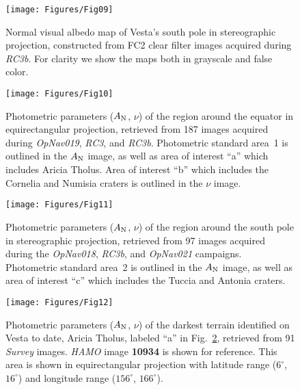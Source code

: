 \documentclass[3p,authoryear]{elsarticle}
\begin{document}

\begin{figure}
\centering
\texttt{[image: Figures/Fig09]}
\caption{Normal visual albedo map of Vesta's south pole in stereographic projection, constructed from FC2 clear filter images acquired during {\it RC3b}. For clarity we show the maps both in grayscale and false color.}
\label{fig:albedo_map_polar}
\end{figure}


\begin{figure}
\centering
\texttt{[image: Figures/Fig10]}
\caption{Photometric parameters ($A_{\rm N}$, $\nu$) of the region around the equator in equirectangular projection, retrieved from 187 images acquired during {\it OpNav019}, {\it RC3}, and {\it RC3b}. Photometric standard area~1 is outlined in the $A_{\rm N}$ image, as well as area of interest ``a'' which includes Aricia Tholus. Area of interest ``b'' which includes the Cornelia and Numisia craters is outlined in the $\nu$ image.}
\label{fig:Equator}
\end{figure}


\begin{figure}
\centering
\texttt{[image: Figures/Fig11]}
\caption{Photometric parameters ($A_{\rm N}$, $\nu$) of the region around the south pole in stereographic projection, retrieved from 97 images acquired during the {\it OpNav018}, {\it RC3b}, and {\it OpNav021} campaigns. Photometric standard area~2 is outlined in the $A_{\rm N}$ image, as well as area of interest ``c'' which includes the Tuccia and Antonia craters.}
\label{fig:SouthPole}
\end{figure}


\begin{figure}
\centering
\texttt{[image: Figures/Fig12]}
\caption{Photometric parameters ($A_{\rm N}$, $\nu$) of the darkest terrain identified on Vesta to date, Aricia Tholus, labeled ``a'' in Fig.~\ref{fig:Equator}, retrieved from 91 {\it Survey} images. {\it HAMO} image {\bf 10934} is shown for reference. This area is shown in equirectangular projection with latitude range ($6^\circ$, $16^\circ$) and longitude range ($156^\circ$, $166^\circ$).}
\label{fig:dark_hill}
\end{figure}
\end{document}
